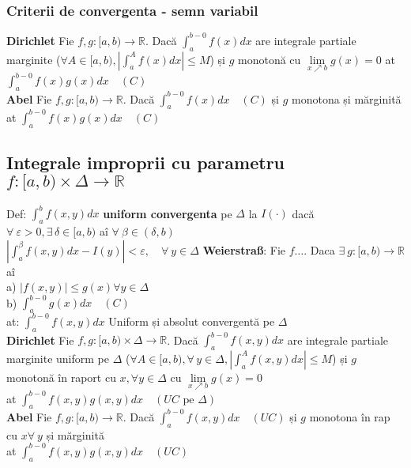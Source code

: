 \documentclass{article}
\newcommand*{\R}{\mathbb{R}}
\renewcommand*{\epsilon}{\varepsilon}
\newcommand*{\fint}[1]{\int_{a}^{b-0} #1(x) dx}
\newcommand*{\fintxy}[1]{\int_{a}^{b-0} #1(x,y) dx}
\begin{document}
\subsubsection*{Criterii de convergenta - semn variabil}
\textbf{Dirichlet} Fie $f, g : [a, b) \to \R$. Dacă $\fint{f}$ are integrale partiale marginite
($\forall A \in [a, b), \left| \int_a^A f(x)dx \right| \leq M$)
și $g $ monotonă cu $\lim\limits_{x\nearrow b} g(x) = 0$ at $\fint{f(x)g}\quad (C)$
\\
\textbf{Abel} Fie $f, g : [a, b) \to \R$. Dacă $\fint{f}\quad (C)$ și $g$ monotona și mărginită at $\fint{f(x)g}\quad (C)$

\subsection*{Integrale improprii cu parametru $f: [a, b) \times \Delta \to \R$}
Def: $\int_a^{b}f(x,y)dx $ \textbf{uniform convergenta} pe $\Delta$ la
\(I(\cdot)\) dacă $\forall\ \epsilon > 0, \exists\, \delta \in [a, b)$ aî
$\forall\ \beta \in (\delta, b)$\\
\(\left| \int_{a}^{\beta} f(x, y)dx - I(y) \right| < \epsilon,\quad \forall\ y \in \Delta \)
\textbf{Weierstraß}: Fie $f\ldots$. Daca $\exists\ g: [a,b)\to \R$ aî\\
\quad a) $|f(x, y)| \le g(x) \forall y \in \Delta$\\
\quad b) $\fint{g}\quad (C)$\\
at: $\int_a^{b-0}f(x,y)dx$ Uniform și absolut convergentă pe $\Delta$
\\
\textbf{Dirichlet} Fie $f, g : [a, b) \times \Delta \to \R$. Dacă $\fintxy{f}$ are integrale partiale marginite uniform pe $\Delta$
($\forall A \in [a, b), \forall\, y \in \Delta,  \left| \int_a^A f(x,y)dx \right| \leq M$)
și $g $ monotonă în raport cu $x, \forall y \in \Delta$ cu $\lim\limits_{x\nearrow b} g(x) = 0$\\
at $\fintxy{f(x, y)g}\quad (UC \text{ pe }\Delta)$
\\
\textbf{Abel} Fie $f, g : [a, b) \to \R$. Dacă $\fintxy{f}\quad (UC)$ și $g$ monotona în rap cu $x \forall\ y$ și mărginită\\ at $\fintxy{f(x, y)g}\quad (UC)$
\end{document}
